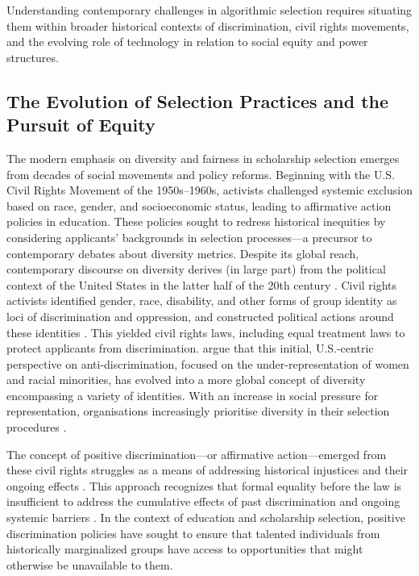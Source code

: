 Understanding contemporary challenges in algorithmic selection requires situating them within broader historical contexts of discrimination, civil rights movements, and the evolving role of technology in relation to social equity and power structures.

\subsection{The Evolution of Selection Practices and the Pursuit of Equity}\label{ssec:context_evolution_equity}
The modern emphasis on diversity and fairness in scholarship selection emerges from decades of social movements and policy reforms. Beginning with the U.S. Civil Rights Movement of the 1950s–1960s, activists challenged systemic exclusion based on race, gender, and socioeconomic status, leading to affirmative action policies in education. These policies sought to redress historical inequities by considering applicants' backgrounds in selection processes—a precursor to contemporary debates about diversity metrics. Despite its global reach, contemporary discourse on diversity derives (in large part) from the political context of the United States in the latter half of the 20th century \cite{nkomo2019diversity}. Civil rights activists identified gender, race, disability, and other forms of group identity as loci of discrimination and oppression, and constructed political actions around these identities \cite{morris1984origins}. This yielded civil rights laws, including equal treatment laws to protect applicants from discrimination. \textcite{nkomo2019diversity} argue that this initial, U.S.-centric perspective on anti-discrimination, focused on the under-representation of women and racial minorities, has evolved into a more global concept of diversity encompassing a variety of identities. With an increase in social pressure for representation, organisations increasingly prioritise diversity in their selection procedures \cite{hsieh2019allocation,minkin2023diversity}.

The concept of positive discrimination—or affirmative action—emerged from these civil rights struggles as a means of addressing historical injustices and their ongoing effects \cite{anderson2010imperative}. This approach recognizes that formal equality before the law is insufficient to address the cumulative effects of past discrimination and ongoing systemic barriers \cite{young1990justice}. In the context of education and scholarship selection, positive discrimination policies have sought to ensure that talented individuals from historically marginalized groups have access to opportunities that might otherwise be unavailable to them.

